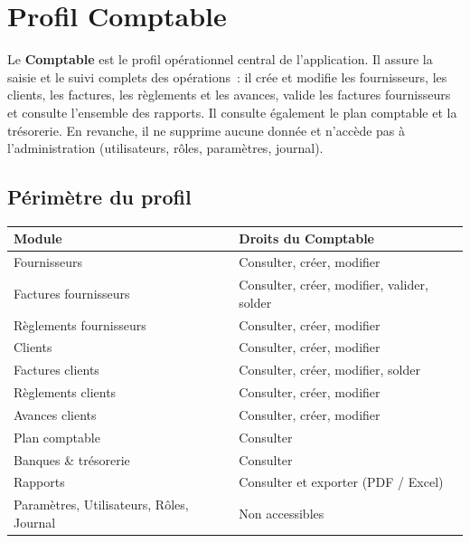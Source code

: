 \chapter{Profil Comptable}

Le \textbf{Comptable} est le profil opérationnel central de l'application. Il assure la saisie et le suivi complets des opérations~: il crée et modifie les fournisseurs, les clients, les factures, les règlements et les avances, valide les factures fournisseurs et consulte l'ensemble des rapports. Il consulte également le plan comptable et la trésorerie. En revanche, il ne supprime aucune donnée et n'accède pas à l'administration (utilisateurs, rôles, paramètres, journal).

\section{Périmètre du profil}

\renewcommand{\arraystretch}{1.3}
\begin{longtable}{>{\raggedright\arraybackslash}p{5.4cm} >{\raggedright\arraybackslash}p{9.2cm}}
\toprule
\textbf{Module} & \textbf{Droits du Comptable} \\
\midrule
\endhead
Fournisseurs & Consulter, créer, modifier \\
Factures fournisseurs & Consulter, créer, modifier, valider, solder \\
Règlements fournisseurs & Consulter, créer, modifier \\
Clients & Consulter, créer, modifier \\
Factures clients & Consulter, créer, modifier, solder \\
Règlements clients & Consulter, créer, modifier \\
Avances clients & Consulter, créer, modifier \\
Plan comptable & Consulter \\
Banques \& trésorerie & Consulter \\
Rapports & Consulter et exporter (PDF / Excel) \\
Paramètres, Utilisateurs, Rôles, Journal & Non accessibles \\
\bottomrule
\end{longtable}
\renewcommand{\arraystretch}{1}


